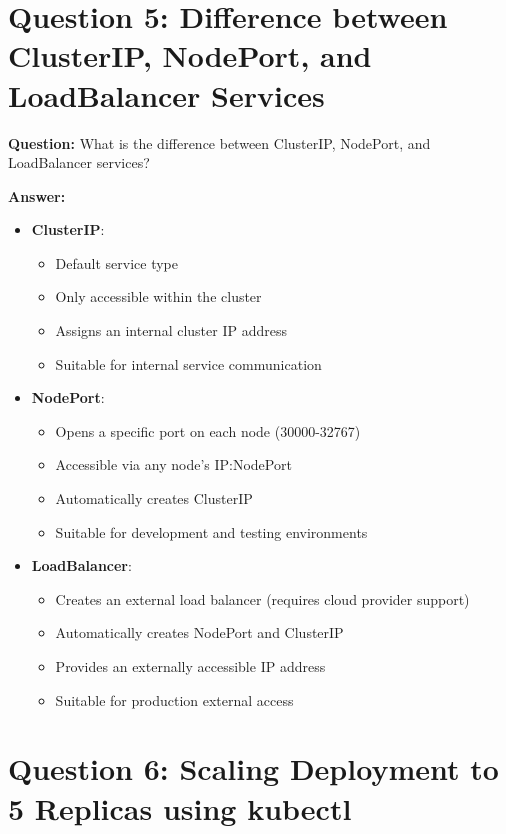 \documentclass[12pt,a4paper]{article}
\begin{document}
\section{Question 5: Difference between ClusterIP, NodePort, and LoadBalancer Services}

\textbf{Question:} What is the difference between ClusterIP, NodePort, and LoadBalancer services?

\textbf{Answer:}

\begin{itemize}
    \item \textbf{ClusterIP}:
    \begin{itemize}
        \item Default service type
        \item Only accessible within the cluster
        \item Assigns an internal cluster IP address
        \item Suitable for internal service communication
    \end{itemize}
    
    \item \textbf{NodePort}:
    \begin{itemize}
        \item Opens a specific port on each node (30000-32767)
        \item Accessible via any node's IP:NodePort
        \item Automatically creates ClusterIP
        \item Suitable for development and testing environments
    \end{itemize}
    
    \item \textbf{LoadBalancer}:
    \begin{itemize}
        \item Creates an external load balancer (requires cloud provider support)
        \item Automatically creates NodePort and ClusterIP
        \item Provides an externally accessible IP address
        \item Suitable for production external access
    \end{itemize}
\end{itemize}

\section{Question 6: Scaling Deployment to 5 Replicas using kubectl}
\end{document}
